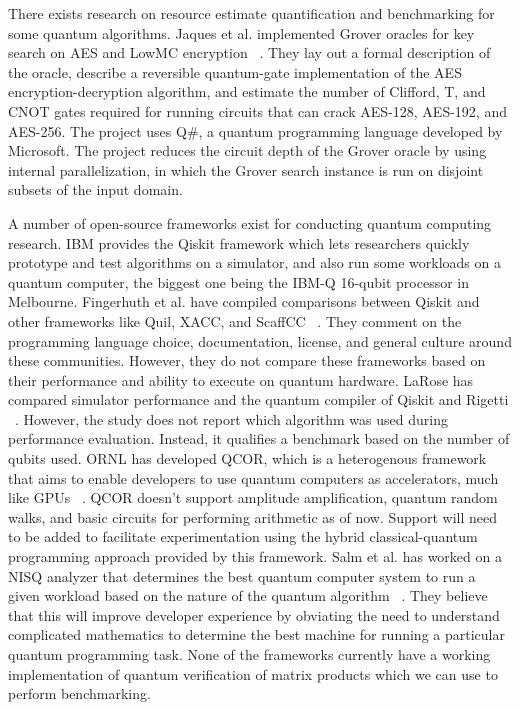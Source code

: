 \documentclass[11pt]{article}
\theoremstyle{definition}
\theoremstyle{remark}
\begin{document}
There exists research on resource estimate quantification and benchmarking for
some quantum algorithms. Jaques et al. implemented Grover oracles for key
search on AES and LowMC encryption ~\cite{jaques2020implementing}. They lay
out a formal description of the oracle,  describe a reversible quantum-gate
implementation of the AES encryption-decryption algorithm, and estimate the
number of Clifford, T, and CNOT gates required for running circuits that can
crack AES-128, AES-192, and AES-256. The project uses Q\#, a quantum
programming language developed by Microsoft. The project reduces the circuit
depth of the Grover oracle by using internal parallelization, in which the
Grover search instance is run on disjoint subsets of the input domain.

A number of open-source frameworks exist for conducting quantum computing
research. IBM provides the Qiskit framework which lets researchers quickly
prototype and test algorithms on a simulator, and also run some workloads on a
quantum computer, the biggest one being the IBM-Q 16-qubit processor in
Melbourne. Fingerhuth et al. have compiled comparisons between Qiskit and other
frameworks like Quil, XACC, and ScaffCC ~\cite{fingerhuth2018open}. They comment
on the programming language choice, documentation, license, and general culture
around these communities. However, they do not compare these frameworks based on
their performance and ability to execute on quantum hardware. LaRose has
compared simulator performance and the quantum compiler of Qiskit and Rigetti
~\cite{larose2019overview}.  However, the study does not report which algorithm
was used during performance evaluation. Instead, it qualifies a benchmark based
on the number of qubits used. ORNL has developed QCOR, which is a heterogenous
framework that aims to enable developers to use quantum computers as
accelerators, much like GPUs ~\cite{mintz2020qcor}. QCOR doesn’t support
amplitude amplification, quantum random walks, and basic circuits for performing
arithmetic as of now. Support will need to be added to facilitate
experimentation using the hybrid classical-quantum programming approach provided
by this framework. Salm et al. has worked on a NISQ analyzer that determines the
best quantum computer system to run a given workload based on the nature of the
quantum algorithm ~\cite{dustdar2020nisq}. They believe that this will improve
developer experience by obviating the need to understand complicated mathematics
to determine the best machine for running a particular quantum programming task.
None of the frameworks currently have a working implementation of quantum
verification of matrix products which we can use to perform benchmarking.
\end{document}
